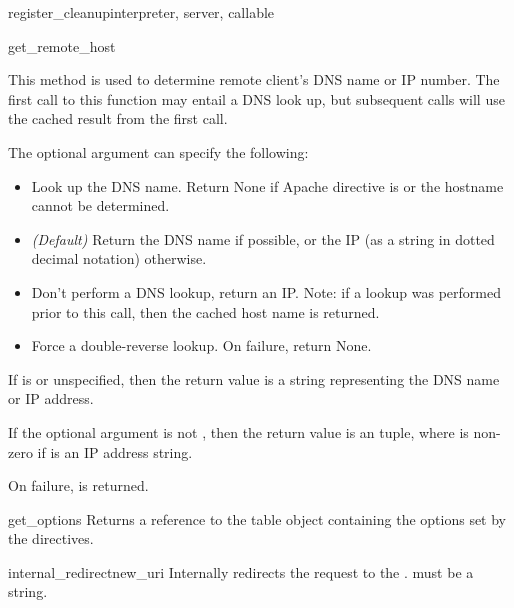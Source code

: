 \begin{funcdesc}{register_cleanup}{interpreter, server, callable}
\begin{methoddesc}[request]{get_remote_host}{}

  This method is used to determine remote client's DNS name or IP
  number. The first call to this function may entail a DNS look up, but
  subsequent calls will use the cached result from the first call.

  The optional  argument can specify the following: 

  \begin{itemize}

  \item
     Look up the DNS name. Return None if Apache
    directive  is  or the hostname cannot
    be determined.

  \item                  
     \emph{(Default)} Return the DNS name if
    possible, or the IP (as a string in dotted decimal notation)
    otherwise.

  \item
     Don't perform a DNS lookup, return an
    IP. Note: if a lookup was performed prior to this call, then the
    cached host name is returned.

  \item
     Force a double-reverse lookup. On 
    failure, return None.

  \end{itemize}

  If  is  or unspecified, then the return
  value is a string representing the DNS name or IP address.

  If the optional  argument is not , then the
  return value is an  tuple, where 
  is non-zero if  is an IP address string.

  On failure,  is returned.

\end{methoddesc}

\begin{methoddesc}[request]{get_options}{}
  Returns a reference to the table object containing the options set by
  the  directives.
\end{methoddesc}

\begin{methoddesc}[request]{internal_redirect}{new_uri}
  Internally redirects the request to the . 
  must be a string.


\end{methoddesc}
\end{funcdesc}
